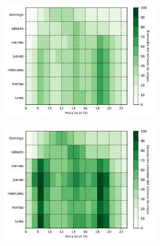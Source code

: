 \begin{figure}[H]
    \centering
    \begin{subfigure}[b]{8cm}
        \includegraphics[width=8cm]{Graphics/daily_and_hour_mean_count_travel.png}
    \end{subfigure}
    \begin{subfigure}[b]{8cm}
        \includegraphics[width=8cm]{Graphics/daily_and_hour_var_count_travel.png}
    \end{subfigure}
\end{figure}
